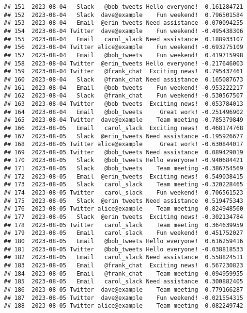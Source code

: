 \documentclass[
]{article}
\begin{document}
\begin{verbatim}
## 151  2023-08-04   Slack   @bob_tweets Hello everyone! -0.161284721
## 152  2023-08-04   Slack  dave@example    Fun weekend!  0.796501584
## 153  2023-08-04   Email  @erin_tweets Need assistance -0.070094255
## 154  2023-08-04 Twitter  dave@example    Fun weekend! -0.495438306
## 155  2023-08-04   Email   carol_slack Need assistance  0.188933107
## 156  2023-08-04 Twitter alice@example    Fun weekend! -0.693275109
## 157  2023-08-04   Email   @bob_tweets    Fun weekend!  0.419715998
## 158  2023-08-04 Twitter  @erin_tweets Hello everyone! -0.217646003
## 159  2023-08-04 Twitter   @frank_chat  Exciting news!  0.795437461
## 160  2023-08-04   Slack   @frank_chat Need assistance  0.165087673
## 161  2023-08-04   Email   @bob_tweets    Fun weekend! -0.953222217
## 162  2023-08-04   Slack   @frank_chat    Fun weekend! -0.530567507
## 163  2023-08-04 Twitter   @bob_tweets  Exciting news!  0.053784013
## 164  2023-08-04   Email   @bob_tweets     Great work! -0.251496902
## 165  2023-08-04 Twitter  dave@example    Team meeting -0.785379849
## 166  2023-08-05   Email   carol_slack  Exciting news!  0.468174768
## 167  2023-08-05   Slack  @erin_tweets Need assistance -0.195926677
## 168  2023-08-05 Twitter alice@example     Great work! -0.630844017
## 169  2023-08-05 Twitter   @bob_tweets Need assistance  0.089429019
## 170  2023-08-05   Slack   @bob_tweets Hello everyone! -0.940684421
## 171  2023-08-05   Slack   @bob_tweets    Team meeting -0.386754569
## 172  2023-08-05   Email  @erin_tweets  Exciting news!  0.549038415
## 173  2023-08-05   Slack   carol_slack    Team meeting -0.320228465
## 174  2023-08-05 Twitter   carol_slack    Fun weekend!  0.706561523
## 175  2023-08-05   Slack  @erin_tweets Need assistance  0.519475343
## 176  2023-08-05 Twitter alice@example    Team meeting  0.824948560
## 177  2023-08-05   Slack  @erin_tweets  Exciting news! -0.302134784
## 178  2023-08-05 Twitter   carol_slack    Team meeting  0.364639959
## 179  2023-08-05   Email   carol_slack    Fun weekend!  0.451752027
## 180  2023-08-05   Email   @bob_tweets Hello everyone!  0.616259416
## 181  2023-08-05 Twitter   @bob_tweets Hello everyone! -0.038818533
## 182  2023-08-05   Email   carol_slack Need assistance  0.558824511
## 183  2023-08-05   Email   @frank_chat  Exciting news!  0.567230823
## 184  2023-08-05   Email   @frank_chat    Team meeting -0.094959955
## 185  2023-08-05   Email   carol_slack Need assistance  0.300882405
## 186  2023-08-05 Twitter  dave@example    Team meeting  0.779166287
## 187  2023-08-05 Twitter  dave@example    Fun weekend! -0.021554315
## 188  2023-08-05 Twitter alice@example    Team meeting  0.082249742

\end{verbatim}
\end{document}
